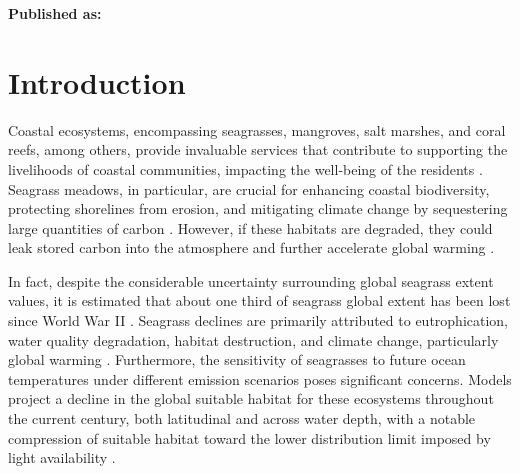 \vspace{3cm}





\textbf{Published as:}

\vspace{0.5cm}


\newpage
\section{Introduction}

Coastal ecosystems, encompassing seagrasses, mangroves, salt marshes, and coral
reefs, among others, provide invaluable services that contribute to supporting
the livelihoods of coastal communities, impacting the well-being of the
residents \cite{MEA2005,IUCN2008}. Seagrass meadows, in particular, are crucial
for enhancing coastal biodiversity, protecting shorelines from erosion, and
mitigating climate change by sequestering large quantities of carbon
\cite{DuarteNCC2013,Mcleod2011}. However, if these habitats are degraded, they
could leak stored carbon into the atmosphere and further accelerate global
warming \cite{DuarteNCC2013,Macreadie2014}.

In fact, despite the considerable uncertainty surrounding global seagrass
extent values, it is estimated that about one third of seagrass global extent
has been lost since World War II \cite{DuarteNCC2013}. Seagrass declines are
primarily attributed to eutrophication, water quality degradation, habitat
destruction, and climate change, particularly global warming
\cite{Waycott2009}. Furthermore, the
sensitivity of seagrasses to future ocean temperatures under different emission
scenarios poses significant concerns. Models project a decline in the global
suitable habitat for these ecosystems throughout the current century, both
latitudinal and across water depth, with a notable compression of suitable
habitat toward the lower distribution limit imposed by light availability
\cite{Jorda2020}.


